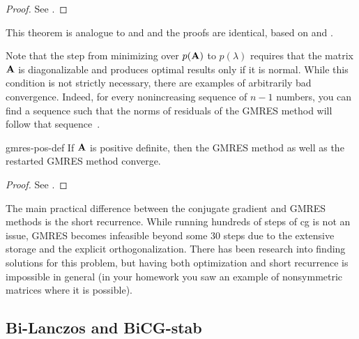 \begin{proof}
  See \cite[Corollary 6.33]{Saad00}.
\end{proof}

\begin{remark}
  This theorem is analogue to  and
   and the proofs are
  identical, based on  and
  .

  Note that the step from minimizing over $p(\mathbf A)$ to $p(\lambda)$
  requires that the matrix $\mathbf A$ is diagonalizable and produces
  optimal results only if it is normal. While this condition is not
  strictly necessary, there are examples of arbitrarily bad
  convergence. Indeed, for every nonincreasing sequence of $n-1$
  numbers, you can find a sequence such that the norms of residuals of
  the GMRES method will follow that
  sequence~\cite{GreenbaumPtakStrakos96}.
\end{remark}

\begin{Theorem}{gmres-pos-def}
  If $\mathbf A$ is positive definite, then the GMRES method as well as
  the restarted GMRES method converge.
\end{Theorem}

\begin{proof}
  See \cite[Theorem 6.30]{Saad00}.
\end{proof}

\begin{remark}
  The main practical difference between the conjugate gradient and
  GMRES methods is the short recurrence. While running hundreds of
  steps of cg is not an issue, GMRES becomes infeasible beyond some 30
  steps due to the extensive storage and the explicit
  orthogonalization. There has been research into finding solutions
  for this problem, but having both optimization and short recurrence
  is impossible in general (in your homework you saw an example of
  nonsymmetric matrices where it is possible).
\end{remark}

\subsection{Bi-Lanczos and BiCG-stab}

